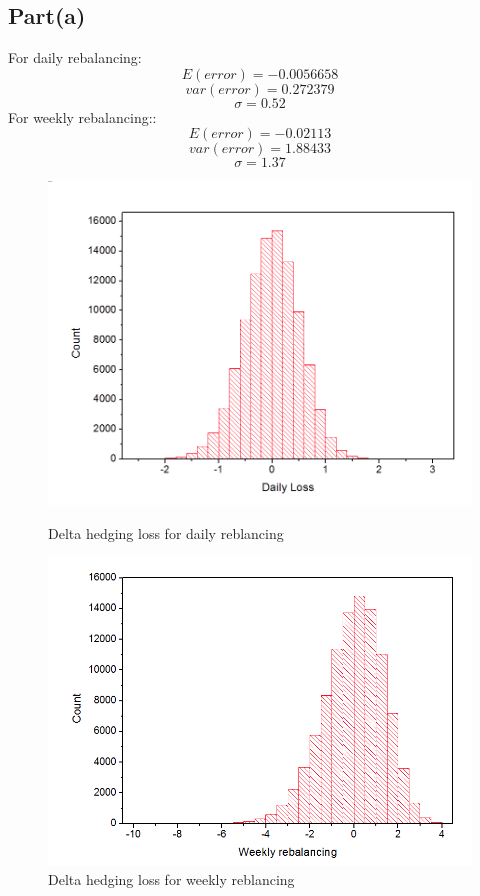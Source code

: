\documentclass{report}
\begin{document}
\subsection*{Part(a)} 
For daily rebalancing:  $$ E(error) = -0.0056658$$
$$ var(error) = 0.272379 $$
$$ \sigma = 0.52 $$
For weekly rebalancing:: $$ E(error) = -0.02113$$
$$ var(error) =1.88433 $$
$$ \sigma = 1.37$$
\begin{figure} \centering
\includegraphics[width=\textwidth]{daily}
\caption{Delta hedging loss for daily reblancing}  

\includegraphics[width=\textwidth]{weekly}
\caption{Delta hedging loss for weekly reblancing}  
\end{figure}
\end{document}
